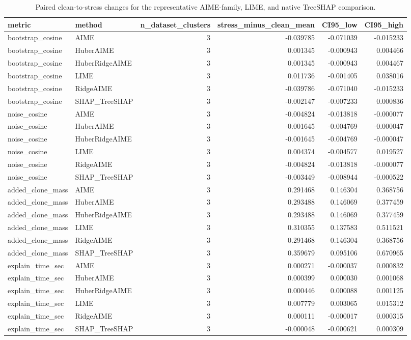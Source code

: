 \begin{table}[t]
\caption{Paired clean-to-stress changes for the representative AIME-family, LIME, and native TreeSHAP comparison.}
\label{tab:r5_final_lime_shap_stress_changes}
\begin{tabular}{llrrrr}
\toprule
metric & method & n_dataset_clusters & stress_minus_clean_mean & CI95_low & CI95_high \\
\midrule
bootstrap_cosine & AIME & 3 & -0.039785 & -0.071039 & -0.015233 \\
bootstrap_cosine & HuberAIME & 3 & 0.001345 & -0.000943 & 0.004466 \\
bootstrap_cosine & HuberRidgeAIME & 3 & 0.001345 & -0.000943 & 0.004467 \\
bootstrap_cosine & LIME & 3 & 0.011736 & -0.001405 & 0.038016 \\
bootstrap_cosine & RidgeAIME & 3 & -0.039786 & -0.071040 & -0.015233 \\
bootstrap_cosine & SHAP_TreeSHAP & 3 & -0.002147 & -0.007233 & 0.000836 \\
noise_cosine & AIME & 3 & -0.004824 & -0.013818 & -0.000077 \\
noise_cosine & HuberAIME & 3 & -0.001645 & -0.004769 & -0.000047 \\
noise_cosine & HuberRidgeAIME & 3 & -0.001645 & -0.004769 & -0.000047 \\
noise_cosine & LIME & 3 & 0.004374 & -0.004577 & 0.019527 \\
noise_cosine & RidgeAIME & 3 & -0.004824 & -0.013818 & -0.000077 \\
noise_cosine & SHAP_TreeSHAP & 3 & -0.003449 & -0.008944 & -0.000522 \\
added_clone_mass & AIME & 3 & 0.291468 & 0.146304 & 0.368756 \\
added_clone_mass & HuberAIME & 3 & 0.293488 & 0.146069 & 0.377459 \\
added_clone_mass & HuberRidgeAIME & 3 & 0.293488 & 0.146069 & 0.377459 \\
added_clone_mass & LIME & 3 & 0.310355 & 0.137583 & 0.511521 \\
added_clone_mass & RidgeAIME & 3 & 0.291468 & 0.146304 & 0.368756 \\
added_clone_mass & SHAP_TreeSHAP & 3 & 0.359679 & 0.095106 & 0.670965 \\
explain_time_sec & AIME & 3 & 0.000271 & -0.000037 & 0.000832 \\
explain_time_sec & HuberAIME & 3 & 0.000399 & 0.000030 & 0.001068 \\
explain_time_sec & HuberRidgeAIME & 3 & 0.000446 & 0.000088 & 0.001125 \\
explain_time_sec & LIME & 3 & 0.007779 & 0.003065 & 0.015312 \\
explain_time_sec & RidgeAIME & 3 & 0.000111 & -0.000017 & 0.000315 \\
explain_time_sec & SHAP_TreeSHAP & 3 & -0.000048 & -0.000621 & 0.000309 \\
\bottomrule
\end{tabular}
\end{table}
